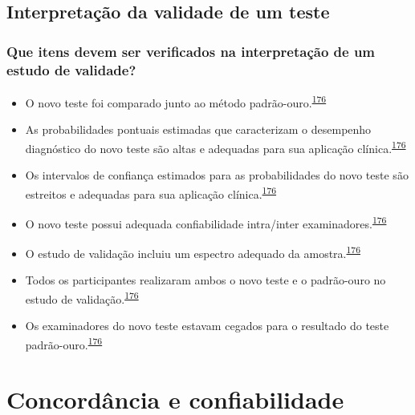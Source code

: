 \documentclass[
  a4paper,
]{book}
\begin{document}
\hypertarget{interpretacao-desempenho}{%
\section{Interpretação da validade de um teste}\label{interpretacao-desempenho}}

\hypertarget{que-itens-devem-ser-verificados-na-interpretauxe7uxe3o-de-um-estudo-de-validade}{%
\subsection{Que itens devem ser verificados na interpretação de um estudo de validade?}\label{que-itens-devem-ser-verificados-na-interpretauxe7uxe3o-de-um-estudo-de-validade}}

\begin{itemize}
\item
  O novo teste foi comparado junto ao método padrão-ouro.\textsuperscript{\protect\hyperlink{ref-greenhalgh1997b}{176}}
\item
  As probabilidades pontuais estimadas que caracterizam o desempenho diagnóstico do novo teste são altas e adequadas para sua aplicação clínica.\textsuperscript{\protect\hyperlink{ref-greenhalgh1997b}{176}}
\item
  Os intervalos de confiança estimados para as probabilidades do novo teste são estreitos e adequadas para sua aplicação clínica.\textsuperscript{\protect\hyperlink{ref-greenhalgh1997b}{176}}
\item
  O novo teste possui adequada confiabilidade intra/inter examinadores.\textsuperscript{\protect\hyperlink{ref-greenhalgh1997b}{176}}
\item
  O estudo de validação incluiu um espectro adequado da amostra.\textsuperscript{\protect\hyperlink{ref-greenhalgh1997b}{176}}
\item
  Todos os participantes realizaram ambos o novo teste e o padrão-ouro no estudo de validação.\textsuperscript{\protect\hyperlink{ref-greenhalgh1997b}{176}}
\item
  Os examinadores do novo teste estavam cegados para o resultado do teste padrão-ouro.\textsuperscript{\protect\hyperlink{ref-greenhalgh1997b}{176}}
\end{itemize}

\hypertarget{analise-concordancia-confiabilidade}{%
\chapter{\texorpdfstring{\textbf{Concordância e confiabilidade}}{Concordância e confiabilidade}}\label{analise-concordancia-confiabilidade}}
\end{document}
